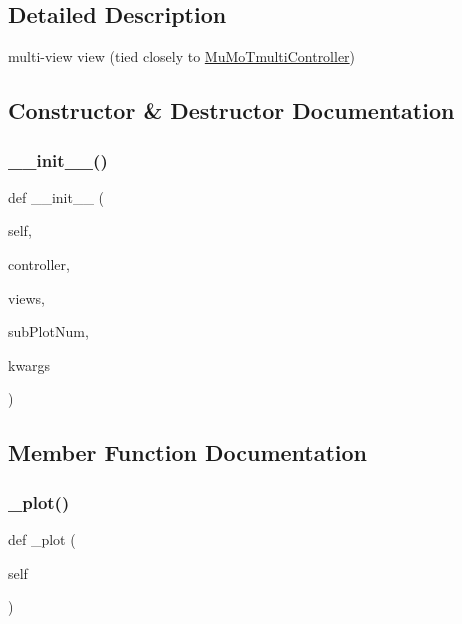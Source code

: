 \subsection{Detailed Description}
multi-\/view view (tied closely to \hyperlink{class_mu_mo_t_1_1_mu_mo_tmulti_controller}{Mu\+Mo\+Tmulti\+Controller}) 

\subsection{Constructor \& Destructor Documentation}
\mbox{\label{class_mu_mo_t_1_1_mu_mo_tmulti_view_aa355c85c06db29c1df7b6505493d5354}} 
\subsubsection{\texorpdfstring{\+\_\+\+\_\+init\+\_\+\+\_\+()}{\_\_init\_\_()}}
{\footnotesize\ttfamily def \+\_\+\+\_\+init\+\_\+\+\_\+ (\begin{DoxyParamCaption}\item[{}]{self,  }\item[{}]{controller,  }\item[{}]{views,  }\item[{}]{sub\+Plot\+Num,  }\item[{}]{kwargs }\end{DoxyParamCaption})}



\subsection{Member Function Documentation}
\mbox{\label{class_mu_mo_t_1_1_mu_mo_tmulti_view_aaff21bb2a6ebdaed50f2f2fb67d0bf5c}} 
\subsubsection{\texorpdfstring{\+\_\+plot()}{\_plot()}}
{\footnotesize\ttfamily def \+\_\+plot (\begin{DoxyParamCaption}\item[{}]{self }\end{DoxyParamCaption})\hspace{0.3cm}{\ttfamily [private]}}

